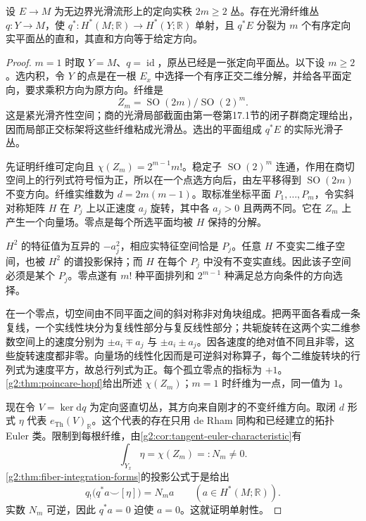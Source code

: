 \begin{lemma}\label{g2:lem:oriented-plane-splitting-real}
	设 \(E\to M\) 为无边界光滑流形上的定向实秩 \(2m\ge2\) 丛。存在光滑纤维丛 \(q:Y\to M\)，使 \(q^*:H^*(M;\mathbb R)\to H^*(Y;\mathbb R)\) 单射，且 \(q^*E\) 分裂为 \(m\) 个有序定向实平面丛的直和，其直和方向等于给定方向。
\end{lemma}
\begin{proof}
	\(m=1\) 时取 \(Y=M\)、\(q=\operatorname{id}\)，原丛已经是一张定向平面丛。以下设 \(m\ge2\)。选内积，令 \(Y\) 的点是在一根 \(E_x\) 中选择一个有序正交二维分解，并给各平面定向，要求乘积方向为原方向。纤维是
	\[
		Z_m=\operatorname{SO}(2m)/\operatorname{SO}(2)^m.
	\]
	这是紧光滑齐性空间；商的光滑局部截面由第一卷第17.1节的闭子群商定理给出，因而局部正交标架将这些纤维粘成光滑丛。选出的平面组成 \(q^*E\) 的实际光滑子丛。

	先证明纤维可定向且 \(\chi(Z_m)=2^{m-1}m!\)。稳定子 \(\operatorname{SO}(2)^m\) 连通，作用在商切空间上的行列式符号恒为正，所以在一个点选方向后，由左平移得到 \(\operatorname{SO}(2m)\) 不变方向。纤维实维数为 \(d=2m(m-1)\)。取标准坐标平面 \(P_1,\ldots,P_m\)，令实斜对称矩阵 \(H\) 在 \(P_j\) 上以正速度 \(a_j\) 旋转，其中各 \(a_j>0\) 且两两不同。它在 \(Z_m\) 上产生一个向量场。零点是每个所选平面均被 \(H\) 保持的分解。

	\(H^2\) 的特征值为互异的 \(-a_j^2\)，相应实特征空间恰是 \(P_j\)。任意 \(H\) 不变实二维子空间，也被 \(H^2\) 的谱投影保持；而 \(H\) 在每个 \(P_j\) 中没有不变实直线。因此该子空间必须是某个 \(P_j\)。零点遂有 \(m!\) 种平面排列和 \(2^{m-1}\) 种满足总方向条件的方向选择。

	在一个零点，切空间由不同平面之间的斜对称非对角块组成。把两平面各看成一条复线，一个实线性块分为复线性部分与复反线性部分；共轭旋转在这两个实二维参数空间上的速度分别为 \(\pm a_i\mp a_j\) 与 \(\pm a_i\pm a_j\)。因各速度的绝对值不同且非零，这些旋转速度都非零。向量场的线性化因而是可逆斜对称算子，每个二维旋转块的行列式为速度平方，故总行列式为正。每个孤立零点的指标为 \(+1\)。\cref{g2:thm:poincare-hopf}给出所述 \(\chi(Z_m)\)；\(m=1\) 时纤维为一点，同一值为 \(1\)。

	现在令 \(V=\ker\mathrm dq\) 为定向竖直切丛，其方向来自刚才的不变纤维方向。取闭 \(d\) 形式 \(\eta\) 代表 \(e_{\mathrm{Th}}(V)_{\mathbb R}\)。这个代表的存在只用 de Rham 同构和已经建立的拓扑 Euler 类。限制到每根纤维，由\cref{g2:cor:tangent-euler-characteristic}有
	\[
		\int_{Y_x}\eta=\chi(Z_m)=:N_m\ne0.
	\]
	\cref{g2:thm:fiber-integration-forms}的投影公式于是给出
	\[
		q_!\bigl(q^*a\smile[\eta]\bigr)=N_m a\qquad(a\in H^*(M;\mathbb R)).
	\]
	实数 \(N_m\) 可逆，因此 \(q^*a=0\) 迫使 \(a=0\)。这就证明单射性。
\end{proof}

